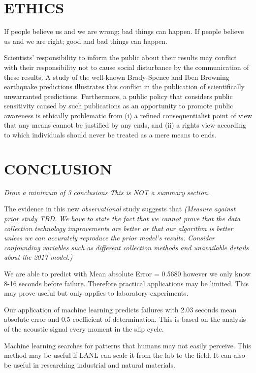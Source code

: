 \documentclass[]{llncs}
\begin{document}
\section{ETHICS}
If people believe us and we are wrong; bad things can happen. If people believe us and we are right; good and bad things can happen.

Scientists’ responsibility to inform the public about their results may conflict with their responsibility not to cause social disturbance by the communication of these results. A study of the well-known Brady-Spence and Iben Browning earthquake predictions illustrates this conflict in the publication of scientifically unwarranted predictions. Furthermore, a public policy that considers public sensitivity caused by such publications as an opportunity to promote public awareness is ethically problematic from (i) a refined consequentialist point of view that any means cannot be justified by any ends, and (ii) a rights view according to which individuals should never be treated as a mere means to ends\cite{Ayhan}.


\section{CONCLUSION}
{\em Draw a minimum of 3 conclusions  This is NOT a summary section.} 
\par

The evidence in this new {\em observational} study suggests that {\em (Measure against prior study TBD. We have to state the fact that we cannot prove that the data collection technology improvements are better or that our algorithm is better unless we can accurately reproduce the prior model's results. Consider confounding variables such as different collection methods and unavailable details about the 2017 model.)}\par

We are able to predict with Mean absolute Error = 0.5680 however we  only know 8-16 seconds before failure.
 Therefore practical applications may be limited. This may prove useful but only applies to laboratory experiments. 
 
 Our application of machine learning predicts failures with 2.03 seconds mean absolute error and 0.5 coefficient of determination. This is based on the analysis of the acoustic signal every moment in the slip cycle. 
 
 Machine learning searches for patterns that humans may not easily perceive. This method may be useful if LANL can scale it from the lab to the field. It can also be useful in researching industrial and natural materials.
 
 
 
 
\par



\end{document}
